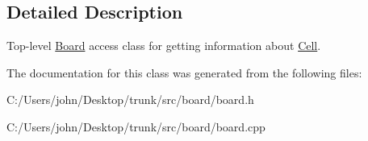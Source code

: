 \subsection{Detailed Description}
Top-\/level \hyperlink{class_board}{Board} access class for getting information about \hyperlink{class_cell}{Cell}. 

The documentation for this class was generated from the following files\+:\begin{DoxyCompactItemize}
\item 
C\+:/\+Users/john/\+Desktop/trunk/src/board/board.\+h\item 
C\+:/\+Users/john/\+Desktop/trunk/src/board/board.\+cpp\end{DoxyCompactItemize}
